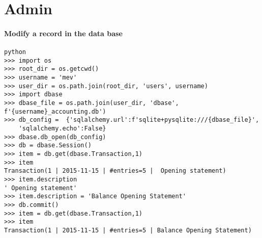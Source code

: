 \documentclass[12pt, a4paper]{article}
\begin{document}
\section{Admin}
\paragraph{Modify a record in the data base}
\begin{verbatim}
python
>>> import os
>>> root_dir = os.getcwd()
>>> username = 'mev'
>>> user_dir = os.path.join(root_dir, 'users', username)
>>> import dbase
>>> dbase_file = os.path.join(user_dir, 'dbase', f'{username}_accounting.db')
>>> db_config =  {'sqlalchemy.url':f'sqlite+pysqlite:///{dbase_file}', 
	'sqlalchemy.echo':False}
>>> dbase.db_open(db_config)
>>> db = dbase.Session()
>>> item = db.get(dbase.Transaction,1)
>>> item
Transaction(1 | 2015-11-15 | #entries=5 |  Opening statement)
>>> item.description
' Opening statement'
>>> item.description = 'Balance Opening Statement'
>>> db.commit()
>>> item = db.get(dbase.Transaction,1)
>>> item
Transaction(1 | 2015-11-15 | #entries=5 | Balance Opening Statement)
\end{verbatim}
  
\end{document}
